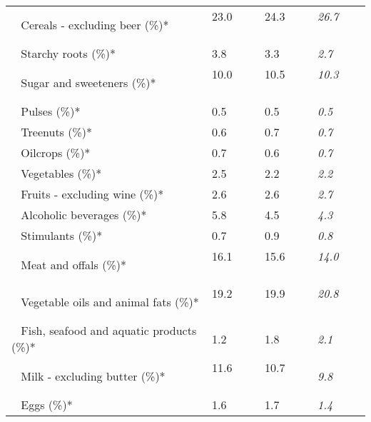 \begin{tabular}{L{3.9cm} R{1cm} R{1cm} R{1cm}}
	 ~ Cereals - excluding beer (\%)* & 23.0 ~ \ \ & 24.3 ~ \ \ & \textit{26.7} ~ \ \ \\ 
	 ~ Starchy roots (\%)* & 3.8 ~ \ \ & 3.3 ~ \ \ & \textit{2.7} ~ \ \ \\ 
	 ~ Sugar and sweeteners (\%)* & 10.0 ~ \ \ & 10.5 ~ \ \ & \textit{10.3} ~ \ \ \\ 
	 ~ Pulses (\%)* & 0.5 ~ \ \ & 0.5 ~ \ \ & \textit{0.5} ~ \ \ \\ 
	 ~ Treenuts (\%)* & 0.6 ~ \ \ & 0.7 ~ \ \ & \textit{0.7} ~ \ \ \\ 
	 ~ Oilcrops (\%)* & 0.7 ~ \ \ & 0.6 ~ \ \ & \textit{0.7} ~ \ \ \\ 
	 ~ Vegetables (\%)* & 2.5 ~ \ \ & 2.2 ~ \ \ & \textit{2.2} ~ \ \ \\ 
	 ~ Fruits - excluding wine (\%)* & 2.6 ~ \ \ & 2.6 ~ \ \ & \textit{2.7} ~ \ \ \\ 
	 ~ Alcoholic beverages (\%)* & 5.8 ~ \ \ & 4.5 ~ \ \ & \textit{4.3} ~ \ \ \\ 
	 ~ Stimulants (\%)* & 0.7 ~ \ \ & 0.9 ~ \ \ & \textit{0.8} ~ \ \ \\ 
	 ~ Meat and offals (\%)* & 16.1 ~ \ \ & 15.6 ~ \ \ & \textit{14.0} ~ \ \ \\ 
	 ~ Vegetable oils and animal fats (\%)* & 19.2 ~ \ \ & 19.9 ~ \ \ & \textit{20.8} ~ \ \ \\ 
	 ~ Fish, seafood and aquatic products (\%)* & 1.2 ~ \ \ & 1.8 ~ \ \ & \textit{2.1} ~ \ \ \\ 
	 ~ Milk - excluding butter (\%)* & 11.6 ~ \ \ & 10.7 ~ \ \ & \textit{9.8} ~ \ \ \\ 
	 ~ Eggs (\%)* & 1.6 ~ \ \ & 1.7 ~ \ \ & \textit{1.4} ~ \ \ \\ 
       \toprule
      \end{tabular}
      \clearpage
{}
